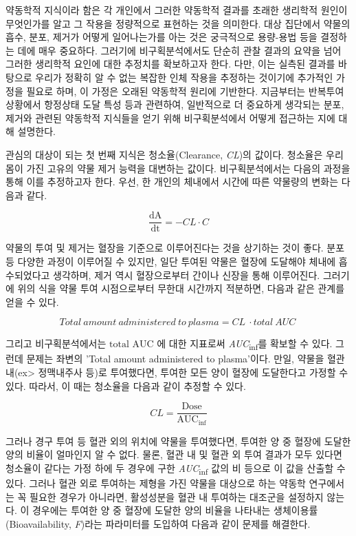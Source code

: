 \documentclass[
  11pt,
  krantz2, a4paper, twoside]{krantz}
\begin{document}
약동학적 지식이라 함은 각 개인에서 그러한 약동학적 결과를 초래한 생리학적 원인이 무엇인가를 알고 그 작용을 정량적으로 표현하는 것을 의미한다. 대상 집단에서 약물의 흡수, 분포, 제거가 어떻게 일어나는가를 아는 것은 궁극적으로 용량-용법 등을 결정하는 데에 매우 중요하다. 그러기에 비구획분석에서도 단순히 관찰 결과의 요약을 넘어 그러한 생리학적 요인에 대한 추정치를 확보하고자 한다. 다만, 이는 실측된 결과를 바탕으로 우리가 정확히 알 수 없는 복잡한 인체 작용을 추정하는 것이기에 추가적인 가정을 필요로 하며, 이 가정은 오래된 약동학적 원리에 기반한다. 지금부터는 반복투여 상황에서 항정상태 도달 특성 등과 관련하여, 일반적으로 더 중요하게 생각되는 분포, 제거와 관련된 약동학적 지식들을 얻기 위해 비구획분석에서 어떻게 접근하는 지에 대해 설명한다.

관심의 대상이 되는 첫 번째 지식은 청소율(Clearance, \emph{CL})의 값이다.
청소율은 우리 몸이 가진 고유의 약물 제거 능력을 대변하는 값이다.
비구획분석에서는 다음의 과정을 통해 이를 추정하고자 한다. 우선, 한
개인의 체내에서 시간에 따른 약물량의 변화는 다음과 같다.

\[\frac{\text{dA}}{\text{dt}} = - CL \cdot C\]

약물의 투여 및 제거는 혈장을 기준으로 이루어진다는 것을 상기하는 것이 좋다.
분포 등 다양한 과정이 이루어질 수 있지만, 일단 투여된 약물은 혈장에 도달해야 체내에 흡수되었다고 생각하며, 제거 역시 혈장으로부터 간이나 신장을 통해 이루어진다.
그러기에 위의 식을 약물 투여 시점으로부터 무한대 시간까지 적분하면, 다음과 같은 관계를 얻을 수 있다.

\[Total\ amount\ administered\ to\ plasma = CL\  \cdot total\ AUC\ \]

그리고 비구획분석에서는 \(\text{total~AUC~}\)에 대한 지표로써 \emph{AUC}\textsubscript{inf}를 확보할 수 있다. 그런데 문제는 좌변의 'Total amount administered to plasma'이다. 만일, 약물을 혈관 내(ex\textgreater{} 정맥내주사 등)로 투여했다면, 투여한 모든 양이 혈장에 도달한다고 가정할 수 있다. 따라서, 이 때는 청소율을 다음과 같이 추정할 수 있다.

\[CL = \frac{\text{Dose}}{\text{AUC}_{\inf}}\]

그러나 경구 투여 등 혈관 외의 위치에 약물을 투여했다면, 투여한 양 중 혈장에 도달한 양의 비율이 얼마인지 알 수 없다. 물론, 혈관 내 및 혈관 외 투여 결과가 모두 있다면 청소율이 같다는 가정 하에 두 경우에 구한 \emph{AUC}\textsubscript{inf} 값의 비 등으로 이 값을 산출할 수 있다. 그러나 혈관 외로 투여하는 제형을 가진 약물을 대상으로 하는 약동학 연구에서는 꼭 필요한 경우가 아니라면, 활성성분을 혈관 내 투여하는 대조군을 설정하지 않는다. 이 경우에는 투여한 양 중 혈장에 도달한 양의 비율을 나타내는 생체이용률(Bioavailability, \emph{F})라는 파라미터를 도입하여 다음과 같이 문제를 해결한다.
\end{document}

